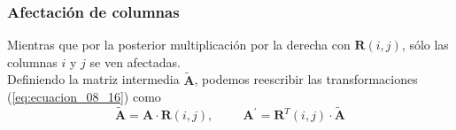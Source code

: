 \begin{frame}
\frametitle{Afectación de columnas}
Mientras que por la posterior multiplicación por la derecha con $\mathbf{R} (i, j)$, sólo las columnas $i$ y $j$ se ven afectadas.
\\
\bigskip
\pause
Definiendo la matriz intermedia $\tilde{\mathbf{A}}$, podemos reescribir las transformaciones (\ref{eq:ecuacion_08_16}) como
\begin{equation}
\tilde{\mathbf{A}} = \mathbf{A} \cdot \mathbf{R}(i, j), \hspace{1cm} \mathbf{A}^{\prime} = \mathbf{R}^{T}(i, j) \cdot \tilde{\mathbf{A}}
\label{eq:ecuacion_08_17}
\end{equation}
\end{frame}

